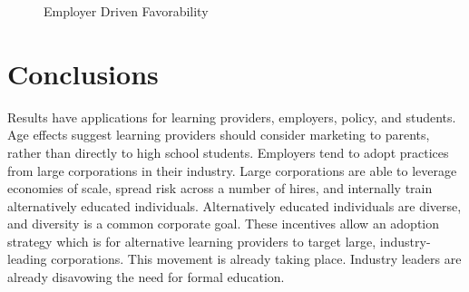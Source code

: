 \documentclass[AER]{./aea-latex-templates/AEA}
\begin{document}
        \begin{figure}[h!]
            \centering
            \caption{Employer Driven Favorability}
        
        
            \label{fig:employer_driven_favorability}
            \end{figure}

        \section{Conclusions}
        
        Results have applications for learning providers, employers, policy, and students.
        Age effects suggest learning providers should consider marketing to parents,
        rather than directly to high school students.
        Employers tend to adopt practices from large corporations in their industry.
        Large corporations are able to leverage economies of scale, spread risk across a number of hires,
        and internally train alternatively educated individuals.
        Alternatively educated individuals are diverse\cite{florentine_2018}, and diversity is a common corporate goal.
        These incentives allow an adoption strategy which is for alternative learning providers to target large,
        industry-leading corporations.
        This movement is already taking place. Industry leaders are already disavowing the need for formal education\cite{glassdoor_2018}.
\end{document}
